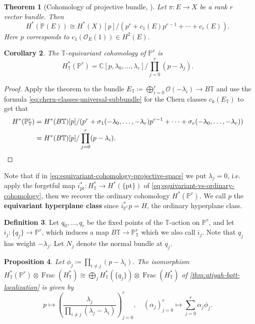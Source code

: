 \documentclass{report}
\theoremstyle{plain}
\newtheorem{theorem}{Theorem}[section]
\newtheorem{proposition}[theorem]{Proposition}
\newtheorem{corollary}[theorem]{Corollary}
\theoremstyle{definition}
\newtheorem{definition}[theorem]{Definition}
\theoremstyle{remark}
\newcommand{\bC}{\mathbb{C}}
\newcommand{\bT}{\mathbb{T}}
\newcommand{\bP}{\mathbb{P}}
\newcommand{\cO}{\mathcal{O}}
\DeclareMathOperator{\Frac}{Frac}
\newcommand{\pt}{\mathrm{pt}}
\begin{document}
\begin{theorem}[Cohomology of projective bundle, {\cite[Example 8.3.4]{Fulton1998}}]
  Let $\pi\colon E \to X$ be a rank $r$ vector bundle. Then
  \[ H^*(\bP(E)) \cong H^*(X)[p]/(p^r + c_1(E)p^{r-1} + \cdots + c_r(E)). \]
  Here $p$ corresponds to $c_1(\cO_E(1)) \in H^2(E)$.
\end{theorem}

\begin{corollary}
  The $\bT$-equivariant cohomology of $\bP^r$ is
  \begin{equation} \label{eq:equivariant-cohomology-projective-space}
    H^*_{\bT}(\bP^r) = \bC[p, \lambda_0, \ldots, \lambda_r]/\prod_{j=0}^r (p - \lambda_j).
  \end{equation}
\end{corollary}

\begin{proof}
  Apply the theorem to the bundle $E_{\bT} \coloneqq \bigoplus_{i=0}^r
  \cO(-\lambda_i) \to B\bT$ and use the formula
  \eqref{eq:chern-classes-universal-subbundle} for the Chern classes
  $c_k(E_{\bT})$ to get that
  \begin{align*}
    H^*(\bP^r_{\bT})
    &= H^*(B\bT)[p]/(p^r + \sigma_1(-\lambda_0, \ldots, -\lambda_r)p^{r-1} + \cdots + \sigma_r(-\lambda_0, \ldots, -\lambda_r)) \\
    &= H^*(B\bT)[p]/\prod_{j=0}^r (p-\lambda_i). \qedhere
  \end{align*}
\end{proof}

Note that if in \eqref{eq:equivariant-cohomology-projective-space} we
put $\lambda_j = 0$, i.e. apply the forgetful map $i_{\pt}^*\colon
H^*_{\bT} \to H^*(\{\pt\})$ of
\eqref{eq:equivariant-vs-ordinary-cohomology}, then we recover the
ordinary cohomology $H^*(\bP^r)$. We call $p$ the {\bf equivariant
  hyperplane class} since $i_{\bP^r}^*p = H$, the ordinary hyperplane
class.

\begin{definition}
  Let $q_0, \ldots, q_r$ be the fixed points of the $\bT$-action on
  $\bP^r$, and let $i_j\colon \{q_j\} \to \bP^r$, which induces a map
  $B\bT \to \bP^r_{\bT}$ which we also call $i_j$. Note that $q_j$ has
  weight $-\lambda_j$. Let $N_j$ denote the normal bundle at $q_j$.
\end{definition}

\begin{proposition}
  Let $\phi_j \coloneqq \prod_{i \neq j} (p - \lambda_i)$. The
  isomorphism $H_{\bT}^*(\bP^r) \otimes \Frac(H_{\bT}^*) \cong
  \bigoplus_j H_{\bT}^*(\{q_j\}) \otimes \Frac(H_{\bT}^*)$ of
  \ref{thm:atiyah-bott-localization} is given by
  \[ p \mapsto \left(\frac{\lambda_j}{\prod_{i \neq j} (\lambda_j - \lambda_i)}\right)_{j=0}^r, \quad (\alpha_j)_{j=0}^r \mapsto \sum_{j=0}^r \alpha_j \phi_j. \]
\end{proposition}
\end{document}
